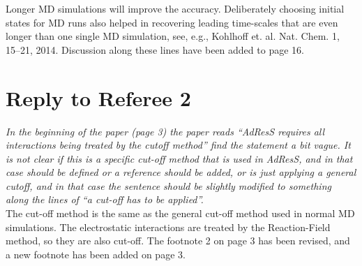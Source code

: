 \documentclass{article}
\begin{document}
\noindent
Longer MD simulations will improve the accuracy.  Deliberately choosing
initial states for MD runs also helped in recovering leading
time-scales that are even longer than one single MD simulation, see,
e.g., Kohlhoff et. al. Nat. Chem. 1, 15--21, 2014.  Discussion along
these lines have been added to page 16.


\section*{Reply to Referee 2}

\noindent
\textit{In the beginning of the paper (page 3) the paper reads ``AdResS
requires all interactions being treated by the cutoff method''
find the statement a bit vague. It is not clear if this is a specific
cut-off method that is used in AdResS, and in that case should be
defined or a reference should be added, or is just applying a general
cutoff, and in that case the sentence should be slightly modified to
something along the lines of ``a cut-off has to be applied''.}\\

\noindent
The cut-off method is the same as the general cut-off method  used in normal MD simulations.
The electrostatic interactions are treated by the Reaction-Field method, so they are also cut-off.
The footnote 2 on page 3 has been revised, and a new footnote has been added on page 3.
\end{document}

